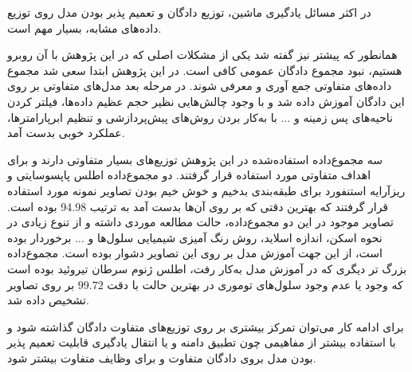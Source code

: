 در اکثر مسائل یادگیری ماشین، توزیع دادگان و تعمیم پذیر بودن مدل روی توزیع داده‌های مشابه، بسیار مهم است. 

همانطور که پیشتر نیز گفته شد یکی از مشکلات اصلی که در این پژوهش با آن روبرو هستیم، نبود مجموع دادگان عمومی کافی است.
در این پژوهش ابتدا سعی شد مجموع داده‌های متفاوتی جمع آوری و معرفی شوند.
در مرحله بعد مدل‌های متفاوتی بر روی این دادگان آموزش داده شد و با وجود چالش‌هایی نظیر حجم عظیم داده‌ها، فیلتر کردن ناحیه‌های پس زمینه و ... با به‌کار بردن روش‌های پیش‌پردازشی و تنظیم ابرپارامتر‌ها، عملکرد خوبی بدست آمد.

سه مجموع‌داده استفاده‌شده در این پژوهش توزیع‌های بسیار متفاوتی دارند و برای اهداف متفاوتی مورد استفاده قرار گرفتند.
دو مجموع‌داده اطلس پاپسوسایتی و ریزآرایه استنفورد برای طبقه‌بندی بدخیم و خوش خیم بودن تصاویر نمونه مورد استفاده قرار گرفتند که بهترین دقتی که بر روی آن‌ها بدست آمد به ترتیب 94.98 بوده است. تصاویر موجود در این دو مجموع‌داده، حالت مطالعه موردی داشته و از تنوع زیادی در نحوه اسکن، اندازه اسلاید، روش رنگ آمیزی شیمیایی سلول‌ها و ... برخوردار بوده است، از این جهت آموزش مدل بر روی این تصاویر دشوار بوده است.
مجموع‌داده بزرگ تر دیگری که در آموزش مدل به‌کار رفت، اطلس ژنوم سرطان تیروئید بوده است که وجود یا عدم وجود سلول‌های توموری در بهترین حالت با دقت  $99.72$ بر روی تصاویر تشخیص داده شد.

برای ادامه کار می‌توان تمرکز بیشتری بر روی توزیع‌های متفاوت دادگان گذاشته شود و با استفاده بیشتر از مفاهیمی چون تطبیق دامنه و یا انتقال یادگیری قابلیت تعمیم پذیر بودن مدل بروی دادگان متفاوت و برای وظایف متفاوت بیشتر شود.